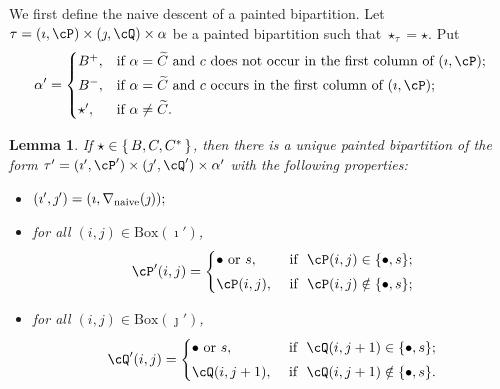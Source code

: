 \documentclass[12pt,a4paper]{amsart}
\def\DD{\nabla}
\numberwithin{equation}{section}
\newtheorem{lem}[thm]{Lemma}
\theoremstyle{remark}
\def\BOX{\mathrm{Box}}
\begin{document}
We first define the naive descent of a painted bipartition. Let $\tau=(\imath,\cP)\times (\jmath,\cQ)\times \alpha$ be a  painted bipartition such that $\star_\tau=\star$. Put
  \begin{equation} \label{eq:def.alphap}
    \alpha'=\begin{cases} B^+,
  & \textrm{if $\alpha=\widetilde{C}$ and $c$ does not occur in the first column of $(\imath,\cP)$}; \smallskip \\
  B^-,
  & \textrm{if $\alpha=\widetilde{C}$ and  $c$ occurs in the first column of $(\imath,\cP)$}; \smallskip \\
  \star', & \textrm{if $\alpha\neq \widetilde C$}.
  \end{cases}
  \end{equation}

\begin{lem}\label{lemDDn1}
  If $\star \in \set{B,C,C^*}$, then there is a unique painted bipartition of the form $\tau'= (\imath',\cP')\times (\jmath',\cQ')\times \alpha'$ with the following properties:
  \begin{itemize}
        \item $
   (\imath',\jmath')= (\imath,\DD_\mathrm{naive}(\jmath)); \smallskip
   $
   \item for all $(i,j)\in \BOX(\imath')$,
   \[
     \cP'(i,j)=\begin{cases}
    \bullet \textrm{ or } s,&\textrm{ if  $\ \cP(i,j)\in \{\bullet, s\}$;} \smallskip \\
  \cP(i,j),& \textrm{ if $\ \cP(i,j)\notin \{\bullet, s\}$};\end{cases}
   \]
   \item for all $(i,j)\in \BOX(\jmath')$,
   \[
     \cQ'(i,j)=\begin{cases}
    \bullet \textrm{ or } s,&\textrm{ if  $\ \cQ(i,j+1)\in \{\bullet, s\}$;} \smallskip \\
  \cQ(i,j+1), & \textrm{ if $\ \cQ(i,j+1)\notin \{\bullet, s\}$}.  \end{cases}
   \]
    \end{itemize}
    \end{lem}
\end{document}
